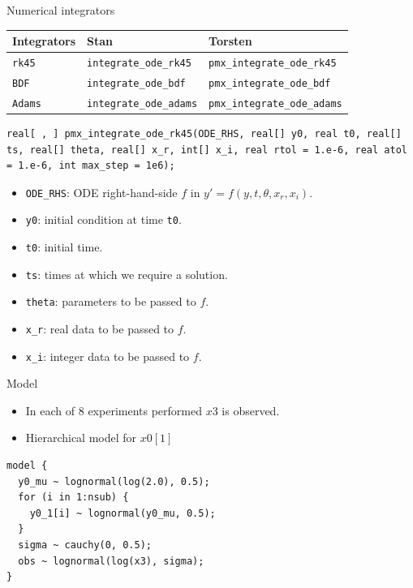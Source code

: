 \documentclass[presentation, allowframebreaks]{beamer}
\begin{document}
\begin{frame}[fragile,label={sec:orgacb1aef}]{Numerical integrators}
 \begin{center}
\begin{tabular}{lll}
Integrators & Stan & Torsten\\
\hline
\texttt{rk45} & \texttt{integrate\_ode\_rk45} & \texttt{pmx\_integrate\_ode\_rk45}\\
\texttt{BDF} & \texttt{integrate\_ode\_bdf} & \texttt{pmx\_integrate\_ode\_bdf}\\
\texttt{Adams} & \texttt{integrate\_ode\_adams} & \texttt{pmx\_integrate\_ode\_adams}\\
\end{tabular}

\end{center}

\begin{verbatim}
real[ , ] pmx_integrate_ode_rk45(ODE_RHS, real[] y0, real t0, real[] ts, real[] theta, real[] x_r, int[] x_i, real rtol = 1.e-6, real atol = 1.e-6, int max_step = 1e6);
\end{verbatim}
\begin{itemize}
\item \texttt{ODE\_RHS}: ODE right-hand-side \(f\) in \(y' = f(y, t, \theta, x_r, x_i)\).
\item \texttt{y0}: initial condition at time \texttt{t0}.
\item \texttt{t0}: initial time.
\item \texttt{ts}: times at which we require a solution.
\item \texttt{theta}: parameters to be passed to \(f\).
\item \texttt{x\_r}: real data to be passed to \(f\).
\item \texttt{x\_i}: integer data to be passed to \(f\).
\end{itemize}
\end{frame}


\begin{frame}[fragile,label={sec:org9bfa959}]{Model}
 \begin{itemize}
\item In each of 8 experiments performed \(x3\) is observed.
\item Hierarchical model for \(x0[1]\)
\end{itemize}
\begin{verbatim}
model {
  y0_mu ~ lognormal(log(2.0), 0.5);
  for (i in 1:nsub) {
    y0_1[i] ~ lognormal(y0_mu, 0.5);    
  }
  sigma ~ cauchy(0, 0.5); 
  obs ~ lognormal(log(x3), sigma);
}
\end{verbatim}
\end{frame}
\end{document}

